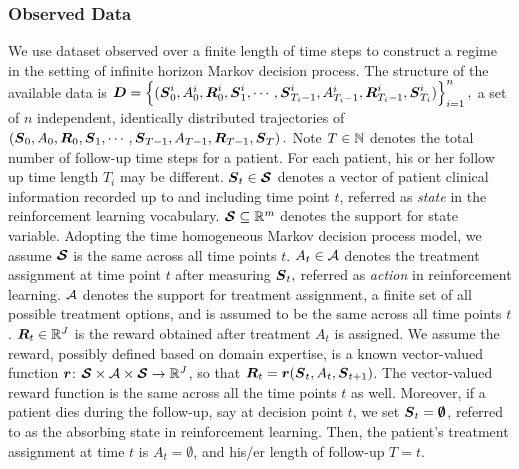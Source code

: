 \subsubsection*{Observed Data}
We use dataset observed over a finite length of time steps to construct a regime in the setting of infinite horizon Markov decision process. The structure of the available data is  $\boldsymbol{D} = \left\{  (\boldsymbol{S}^i_{0}, A^i_{0}, \boldsymbol{R}^i_{0} , \boldsymbol{S}^i_{1}, \cdots, 
\boldsymbol{S}^i_{T_i-1} , A^i_{T_i-1}, \boldsymbol{R}^i_{T_i-1}, \boldsymbol{S}^i_{T_i}) \right\}_{i=1}^n,$
a set of $n$ independent, identically distributed trajectories of
$\left(\boldsymbol{S}_{0}, A_{0}, \boldsymbol{R}_{0} , \boldsymbol{S}_{1}, \cdots, 
\boldsymbol{S}_{T-1} , A_{T-1}, \boldsymbol{R}_{T-1}, \boldsymbol{S}_{T}\right).$
Note $T \in \mathbb{N}$ denotes the total number of follow-up time steps for a patient. For each patient, his or her follow up time length $T_i$ may be different. $\boldsymbol{S}_{t} \in \boldsymbol{\mathcal{S}}$ denotes a vector of patient clinical information recorded up to and including time point $t$, referred as \textit{state} in the reinforcement learning vocabulary. $\boldsymbol{\mathcal{S}} \subseteq \mathbb{R}^m$ denotes the support for state variable. Adopting the time homogeneous Markov decision process model, we assume $\boldsymbol{\mathcal{S}}$ is the same across all time points $t$.  $A_{t} \in \mathcal{A}$ denotes the treatment assignment at time point $t$ after measuring $\boldsymbol{S}_{t},$  referred as \textit{action} in reinforcement learning.  $\mathcal{A}$ denotes the support for treatment assignment, a finite set of all possible treatment options, and is assumed to be the same across all time points $t$. $\boldsymbol{R}_{t} \in \mathbb{R}^J$ is the reward obtained after treatment $A_{t}$ is assigned. We assume the reward, possibly defined based on domain expertise, is a known vector-valued function $\boldsymbol{r}$: $\boldsymbol{\mathcal{S}} \times \mathcal{A}  \times \boldsymbol{\mathcal{S}} \to \mathbb{R}^J $, so that $\boldsymbol{R}_{t} = \boldsymbol{r}(\boldsymbol{S}_{t}, A_t, \boldsymbol{S}_{t+1})$. The vector-valued reward function is the same across all the time points $t$ as well. Moreover, if a patient dies during the follow-up, say at decision point $t$, we set $\boldsymbol{S}_t = \boldsymbol{\emptyset}$, referred to as the absorbing state in reinforcement learning. Then, the patient's treatment assignment at time $t$ is $A_t=\emptyset$, and his/er length of follow-up $T = t$.	
